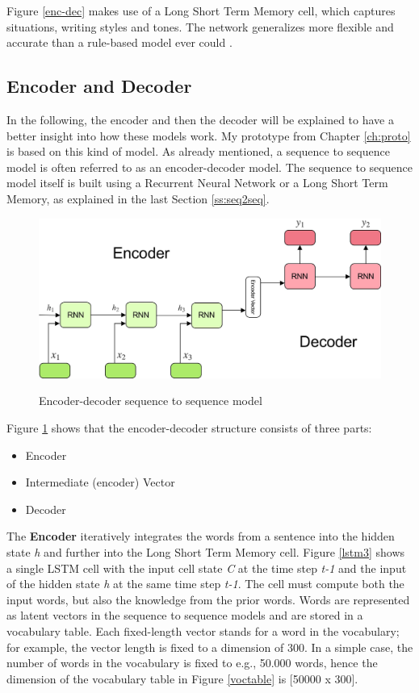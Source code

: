 Figure \ref{enc-dec} makes use of a Long Short Term Memory cell, which captures situations, writing styles and tones. The network generalizes more flexible and accurate than a rule-based model ever could \cite{google}. 


\subsection{Encoder and Decoder}\label{ss:encdec}

In the following, the encoder and then the decoder will be explained to have a better insight into how these models work. My prototype from Chapter \ref{ch:proto} is based on this kind of model. As already mentioned, a sequence to sequence model is often referred to as an encoder-decoder model. The sequence to sequence model itself is built using a Recurrent Neural Network or a Long Short Term Memory, as explained in the last Section \ref{ss:seq2seq}.

\begin{figure}
	\begin{center}
		\includegraphics[width=4.5in]{photos/encoderdecoder.jpeg}\\
		\caption{Encoder-decoder sequence to sequence model \cite{encdec}}\label{encdecseq}
	\end{center}
\end{figure}

Figure \ref{encdecseq} shows that the encoder-decoder structure consists of three parts:

\begin{itemize}
	\item Encoder
	\item Intermediate (encoder) Vector
	\item Decoder
\end{itemize}


The \textbf{Encoder} iteratively integrates the words from a sentence into the hidden state \textit{h} and further into the Long Short Term Memory cell.
Figure \ref{lstm3} shows a single LSTM cell with the input cell state \textit{C} at the time step \textit{t-1} and the input of the hidden state \textit{h} at the same time step \textit{t-1}. The cell must compute both the input words, but also the knowledge from the prior words. Words are represented as latent vectors in the sequence to sequence models and are stored in a vocabulary table. Each fixed-length vector stands for a word in the vocabulary; for example, the vector length is fixed to a dimension of 300. In a simple case, the number of words in the vocabulary is fixed to e.g., 50.000 words, hence the dimension of the vocabulary table in Figure \ref{voctable} is [50000 x 300]. 

